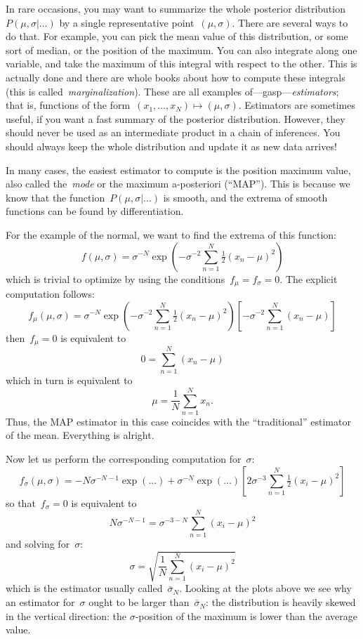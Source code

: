 In rare occasions, you may want to summarize the whole posterior
distribution~$P(\mu,\sigma|\ldots)$ by a single representative
point~$(\mu,\sigma)$.  There are several ways to do that.  For example, you
can pick the mean value of this distribution, or some sort of median, or the
position of the maximum.  You can also integrate along one variable, and take
the maximum of this integral with respect to the other.  This is actually
done and there are whole books about how to compute these integrals (this is
called~\emph{marginalization}).  These are all examples
of---gasp---\emph{estimators}; that is, functions of the
form~$(x_1,\ldots,x_N)\mapsto(\mu,\sigma)$.  Estimators are sometimes useful,
if you want a fast summary of the posterior distribution.  However, they
should never be used as an intermediate product in a chain of inferences.
You should always keep the whole distribution and update it as new data
arrives!

In many cases, the easiest estimator to compute is the position maximum
value, also called the~\emph{mode} or the maximum a-posteriori (``MAP'').
This is because we know that the function~$P(\mu,\sigma|\ldots)$ is smooth,
and the extrema of smooth functions can be found by differentiation.

For the example of the normal, we want to find the extrema of this
function:
$$
f(\mu,\sigma)
=
\sigma^{-N}\exp\left(-\sigma^{-2}\sum_{n=1}^N\tfrac{1}{2}(x_n-\mu)^2\right)
$$
which is trivial to optimize by using the conditions~$f_\mu=f_\sigma=0$.
The explicit computation follows:
$$
f_\mu(\mu,\sigma)
=
\sigma^{-N}\exp\left(-\sigma^{-2}\sum_{n=1}^N\tfrac{1}{2}(x_n-\mu)^2\right)
\left[
	-\sigma^{-2}\sum_{n=1}^N(x_n-\mu)
\right]
$$
then~$f_\mu=0$ is equivalent to
$$
0 = \sum_{n=1}^N(x_n-\mu)
$$
which in turn is equivalent to
$$
\mu=\frac{1}{N}\sum_{n=1}^Nx_n.
$$
Thus, the MAP estimator in this case coincides with the ``traditional''
estimator of the mean.  Everything is alright.

Now let us perform the corresponding computation for~$\sigma$:
$$
f_\sigma(\mu,\sigma)
=
-N\sigma^{-N-1}\exp\left(...\right)
+\sigma^{-N}\exp\left(...\right)
\left[
	2\sigma^{-3}\sum_{n=1}^N\tfrac{1}{2}(x_i-\mu)^2
\right]
$$
so that~$f_\sigma=0$ is equivalent to
$$
N\sigma^{-N-1}
=
\sigma^{-3-N}\sum_{n=1}^N(x_i-\mu)^2
$$
and solving for~$\sigma$:
$$
\sigma=\sqrt{\frac{1}{N}\sum_{n=1}^N(x_i-\mu)^2}
$$
which is the estimator usually called~$\bar\sigma_{N}$.  Looking at the
plots above we see why an estimator for~$\sigma$ ought to be larger
than~$\bar\sigma_{N}$: the distribution is heavily skewed in the vertical
direction: the $\sigma$-position of the maximum is lower than the average
value.


